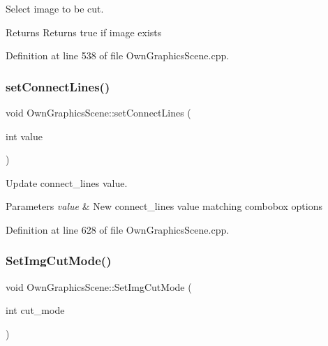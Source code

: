 Select image to be cut. 

\begin{DoxyReturn}{Returns}
Returns true if image exists 
\end{DoxyReturn}


Definition at line 538 of file Own\+Graphics\+Scene.\+cpp.

\mbox{\label{classOwnGraphicsScene_ad62254e1884fa4817ff1beaa3bc6c011}} 
\subsubsection{\texorpdfstring{set\+Connect\+Lines()}{setConnectLines()}}
{\footnotesize\ttfamily void Own\+Graphics\+Scene\+::set\+Connect\+Lines (\begin{DoxyParamCaption}\item[{int}]{value }\end{DoxyParamCaption})}



Update connect\+\_\+lines value. 


\begin{DoxyParams}{Parameters}
{\em value} & New connect\+\_\+lines value matching combobox options \\
\hline
\end{DoxyParams}


Definition at line 628 of file Own\+Graphics\+Scene.\+cpp.

\mbox{\label{classOwnGraphicsScene_a656919c9fdd0827ae182d3d3f5f91e4f}} 
\subsubsection{\texorpdfstring{Set\+Img\+Cut\+Mode()}{SetImgCutMode()}}
{\footnotesize\ttfamily void Own\+Graphics\+Scene\+::\+Set\+Img\+Cut\+Mode (\begin{DoxyParamCaption}\item[{int}]{cut\+\_\+mode }\end{DoxyParamCaption})}



